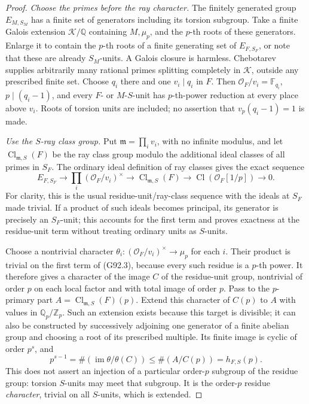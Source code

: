 \begin{proof}
\emph{Choose the primes before the ray character.}
The finitely generated group \(E_{M,S_M}\) has a finite set of
generators including its torsion subgroup.  Take a finite Galois
extension \(\mathcal K/\mathbb Q\) containing \(M,\mu_p\), and the
\(p\)-th roots of these generators.  Enlarge it to contain the
\(p\)-th roots of a finite generating set of \(E_{F,S_F}\), or note
that these are already \(S_M\)-units.  A Galois closure is harmless.
Chebotarev supplies arbitrarily many rational primes splitting
completely in \(\mathcal K\), outside any prescribed finite set.
Choose \(q_i\) there and one \(v_i\mid q_i\) in \(F\).
Then \(\mathcal O_F/v_i=\mathbb F_{q_i}\), \(p\mid(q_i-1)\), and
every \(F\)- or \(M\)-\(S\)-unit has \(p\)-th-power reduction at
every place above \(v_i\).  Roots of torsion units are included;
no assertion that \(v_p(q_i-1)=1\) is made.

\emph{Use the \(S\)-ray class group.}
Put \(\mathfrak m=\prod_i v_i\), with no infinite modulus, and
let \(\operatorname{Cl}_{\mathfrak m,S}(F)\) be the ray class group
modulo the additional ideal classes of all primes in \(S_F\).
The ordinary ideal definition of ray classes gives the exact sequence
\[
 E_{F,S_F}\longrightarrow
 \prod_i(\mathcal O_F/v_i)^\times
 \longrightarrow \operatorname{Cl}_{\mathfrak m,S}(F)
 \longrightarrow \operatorname{Cl}(\mathcal O_F[1/p])
 \longrightarrow0.
 \tag{G92.3}
\]
For clarity, this is the usual residue-unit/ray-class sequence with
the ideals at \(S_F\) made trivial.  If a product of such ideals
becomes principal, its generator is precisely an \(S_F\)-unit;
this accounts for the first term and proves exactness at the
residue-unit term without treating ordinary units as \(S\)-units.

Choose a nontrivial character
\(\theta_i:(\mathcal O_F/v_i)^\times\to\mu_p\) for each \(i\).
Their product is trivial on the first term of (G92.3), because every
such residue is a \(p\)-th power.  It therefore gives a character
of the image \(C\) of the residue-unit group, nontrivial of order
\(p\) on each local factor and with total image of order \(p\).
Pass to the \(p\)-primary part
\(A=\operatorname{Cl}_{\mathfrak m,S}(F)(p)\).
Extend this character of \(C(p)\) to \(A\) with values in
\(\mathbb Q_p/\mathbb Z_p\).  Such an extension exists because this
target is divisible; it can also be constructed by successively
adjoining one generator of a finite abelian group and choosing a
root of its prescribed multiple.
Its finite image is cyclic of order \(p^s\), and
\[
 p^{s-1}=\#(\operatorname{im}\theta/\theta(C))
           \leq \#(A/C(p))=h_{F,S}(p).
 \tag{G92.4}
\]
This does not assert an injection of a particular order-\(p\)
subgroup of the residue group: torsion \(S\)-units may meet that
subgroup.  It is the order-\(p\) residue \emph{character}, trivial
on all \(S\)-units, which is extended.


\end{proof}
